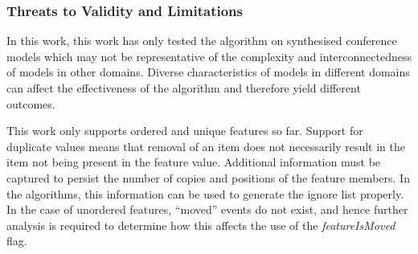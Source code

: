 \documentclass[12pt, a4paper]{report} \usepackage[titletoc]{appendix}
\begin{document}
\subsubsection{Threats to Validity and Limitations}
\label{sec:limitations_and_future_work}
In this work, this work has only tested the algorithm on synthesised conference models which may not be representative of the complexity and interconnectedness of models in other domains. Diverse characteristics of models in different domains can affect the effectiveness of the algorithm and therefore yield different outcomes. 

This work only supports ordered and unique features so far. Support for duplicate values means that removal of an item does not necessarily result in the item not being present in the feature value. Additional information must be captured to persist the number of copies and positions of the feature members. In the algorithms, this information can be used to generate the ignore list properly. In the case of unordered features, ``moved'' events do not exist, and hence further analysis is required to determine how this affects the use of the \emph{featureIsMoved} flag. 







\end{document}
